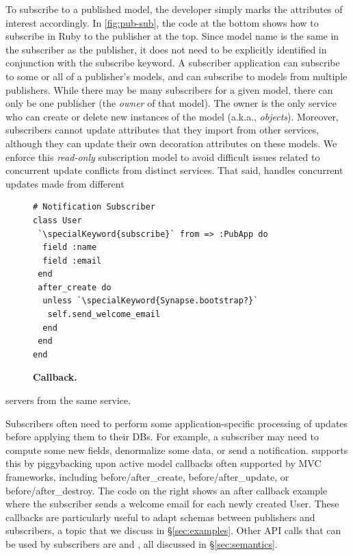 To subscribe to a published model, the developer simply marks the attributes of
interest accordingly.  In \F\ref{fig:pub-sub}, the code at the bottom
shows how to subscribe in Ruby to the publisher at the top.  Since
model name is the same in the subscriber as the publisher, it does not
need to be explicitly identified in conjunction with the 
{\code subscribe} keyword. 
A subscriber application can subscribe to some or all of a publisher's
models, and can subscribe to models from multiple publishers. While
there may be many subscribers for a given model, there can only be one
publisher (the {\em owner} of that model). The owner is the only
service who can create or delete new instances of the model (a.k.a.,
{\em objects}). Moreover, subscribers cannot update attributes that they
import from other services, although they can update their own
decoration attributes on these models. We enforce this {\em read-only}
subscription model to avoid difficult issues related to concurrent update
conflicts from distinct services.
That said, \synapse handles concurrent updates made from different
\begin{figure}
\vspace{-0.2cm}
\begin{minipage}{.2\textwidth}
\begin{lstlisting}[xleftmargin=2pt,framexleftmargin=2pt]
# Notification Subscriber
class User
 `\specialKeyword{subscribe}` from => :PubApp do
  field :name
  field :email
 end
 after_create do
  unless `\specialKeyword{Synapse.bootstrap?}`
   self.send_welcome_email
  end
 end
end
\end{lstlisting}
\end{minipage}
\vspace{-0.5cm}
\caption{{\footnotesize {\bf Callback.}}}
\label{fig:welcome-email}
\vspace{-5pt}
\end{figure}
\noindent
servers from the same service.

Subscribers often need to perform some
application-specific processing of updates before applying them to their
DBs. For example, a subscriber may need to compute some new fields,
denormalize some data, or send a notification.  \synapse supports this by
piggybacking upon active model callbacks often supported by MVC frameworks,
including {\code \small before/after\_create}, {\code \small before/after\_update}, or
{\code \small  before/after\_destroy}.
The code on the right shows an after callback example where the subscriber
sends a welcome email for each newly created User.
These callbacks are particularly useful to adapt schemas
between publishers and subscribers, a topic that we discuss in
\S\ref{sec:examples}.  Other API calls that can be used by subscribers are
{} and {}, all
discussed in \S\ref{sec:semantics}.  

